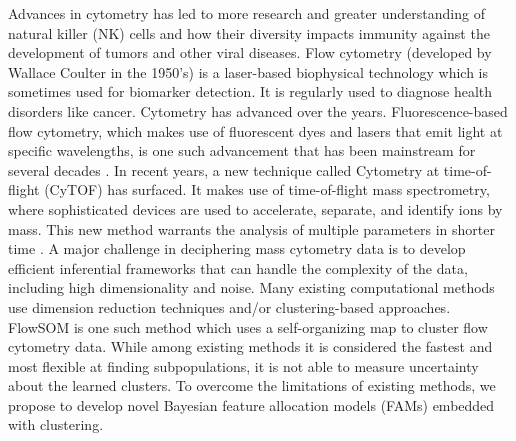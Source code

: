 \documentclass[12pt,]{article}
\def\Z{\bm{Z}}
\begin{document}
Advances in cytometry has led to more research and greater understanding  of
natural killer (NK) cells and how their diversity impacts immunity against the
development of tumors and other viral diseases. Flow cytometry (developed by
Wallace Coulter in the 1950's) is a laser-based biophysical technology which is
sometimes used for biomarker detection. It is regularly used to diagnose health
disorders like cancer. Cytometry has advanced over the years.
Fluorescence-based flow cytometry, which makes use of fluorescent dyes and
lasers that emit light at specific wavelengths, is one such advancement that
has been mainstream for several decades \citep{herzenberg2002history}.  In recent
years, a new technique called Cytometry at time-of-flight (CyTOF) has surfaced.
It makes use of time-of-flight mass spectrometry, where sophisticated devices
are used to accelerate, separate, and identify ions by mass. This new method
warrants the analysis of multiple parameters in shorter time \citep{cheung2011screening}. 
A major challenge in deciphering mass cytometry data is to develop efficient
inferential frameworks that can handle the complexity of the data, including
high dimensionality and noise. Many existing computational methods use
dimension reduction techniques and/or clustering-based approaches. 
FlowSOM \citep{van2015flowsom} is one such method which uses a self-organizing
map to cluster flow cytometry data. While among existing methods it is
considered the fastest and most flexible at finding subpopulations, it is not
able to measure uncertainty about the learned clusters.
To overcome the limitations of existing methods, we propose to develop novel
Bayesian feature allocation models (FAMs) embedded with clustering. 
\end{document}

